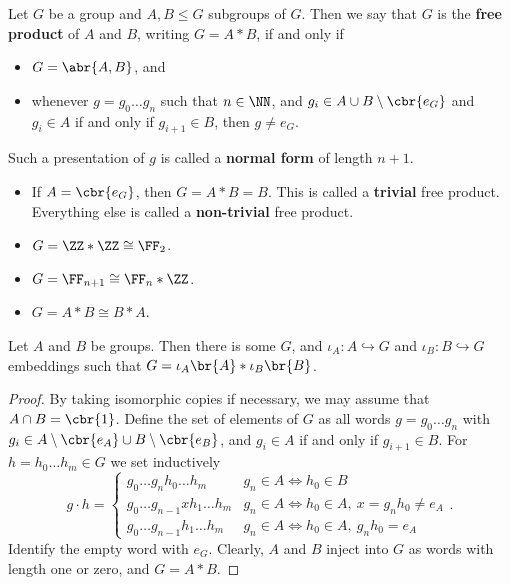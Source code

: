 \begin{definition}
Let $ G $ be a group and $ A, B \le G $ subgroups of $ G $. Then we say that $ G $ is the \textbf{free product} of $ A $ and $ B $, writing $ G = A * B $, if and only if
\begin{itemize}
\item $ G = \abr{A, B} $, and
\item whenever $ g = g_0 \dots g_n $ such that $ n \in \NN $, and $ g_i \in A \cup B \setminus \cbr{e_G} $ and $ g_i \in A $ if and only if $ g_{i + 1} \in B $, then $ g \ne e_G $.
\end{itemize}
Such a presentation of $ g $ is called a \textbf{normal form} of length $ n + 1 $.
\end{definition}

\begin{remark}
\hfill
\begin{itemize}
\item If $ A = \cbr{e_G} $, then $ G = A * B = B $. This is called a \textbf{trivial} free product. Everything else is called a \textbf{non-trivial} free product.
\item $ G = \ZZ * \ZZ \cong \FF_2 $.
\item $ G = \FF_{n + 1} \cong \FF_n * \ZZ $.
\item $ G = A * B \cong B * A $.
\end{itemize}
\end{remark}

\begin{lemma}
Let $ A $ and $ B $ be groups. Then there is some $ G $, and $ \iota_A : A \hookrightarrow G $ and $ \iota_B : B \hookrightarrow G $ embeddings such that $ G = \iota_A\br{A} * \iota_B\br{B} $.
\end{lemma}

\begin{proof}
By taking isomorphic copies if necessary, we may assume that $ A \cap B = \cbr{1} $. Define the set of elements of $ G $ as all words $ g = g_0 \dots g_n $ with $ g_i \in A \setminus \cbr{e_A} \cup B \setminus \cbr{e_B} $, and $ g_i \in A $ if and only if $ g_{i + 1} \in B $. For $ h = h_0 \dots h_m \in G $ we set inductively
$$ g \cdot h =
\begin{cases}
g_0 \dots g_nh_0 \dots h_m & g_n \in A \iff h_0 \in B \\
g_0 \dots g_{n - 1}xh_1 \dots h_m & g_n \in A \iff h_0 \in A, \ x = g_nh_0 \ne e_A \\
g_0 \dots g_{n - 1}h_1 \dots h_m & g_n \in A \iff h_0 \in A, \ g_nh_0 = e_A
\end{cases}.
$$
Identify the empty word with $ e_G $. Clearly, $ A $ and $ B $ inject into $ G $ as words with length one or zero, and $ G = A * B $.
\end{proof}

